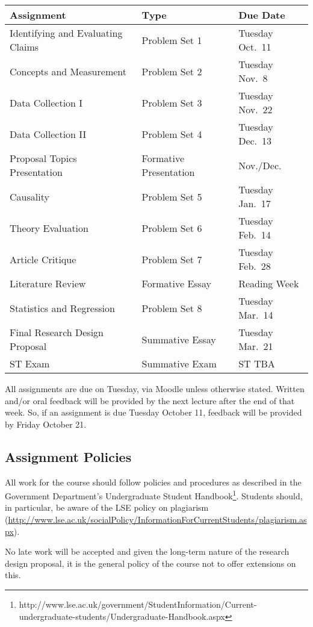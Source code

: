 \documentclass[12pt,a4paper]{article}
\begin{document}
\begin{center}
\begin{tabular}{lll} \toprule
\textbf{Assignment} & \textbf{Type} & \textbf{Due Date} \\ \midrule
Identifying and Evaluating Claims & Problem Set 1 & Tuesday Oct.~11 \\
Concepts and Measurement & Problem Set 2 & Tuesday Nov.~8 \\
Data Collection I & Problem Set 3 & Tuesday Nov.~22 \\
Data Collection II & Problem Set 4 & Tuesday Dec.~13 \\
Proposal Topics Presentation & Formative Presentation & Nov./Dec. \\  \midrule 
Causality & Problem Set 5 & Tuesday Jan.~17 \\
Theory Evaluation & Problem Set 6 & Tuesday Feb.~14 \\
Article Critique & Problem Set 7 & Tuesday Feb.~28 \\
Literature Review & Formative Essay & Reading Week \\ 
Statistics and Regression & Problem Set 8 & Tuesday Mar.~14 \\ \midrule 
Final Research Design Proposal & Summative Essay & Tuesday Mar.~21 \\ \midrule 
ST Exam & Summative Exam & ST TBA \\
\bottomrule
\end{tabular}
\end{center}

All assignments are due on Tuesday, via Moodle unless otherwise stated. Written and/or oral feedback will be provided by the next lecture after the end of that week. So, if an assignment is due Tuesday October 11, feedback will be provided by Friday October 21.

\subsection{Assignment Policies}

All work for the course should follow policies and procedures as described in the Government Department's Undergraduate Student Handbook\footnote{http://www.lse.ac.uk/government/StudentInformation/Current-undergraduate-students/Undergraduate-Handbook.aspx}. Students should, in particular, be aware of the LSE policy on plagiarism (\url{http://www.lse.ac.uk/socialPolicy/InformationForCurrentStudents/plagiarism.aspx}).

No late work will be accepted and given the long-term nature of the research design proposal, it is the general policy of the course not to offer extensions on this.
\end{document}
